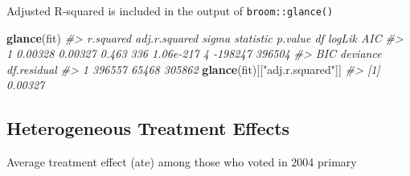 \documentclass[]{book}
\newenvironment{Shaded}{\begin{snugshade}}{\end{snugshade}}
\newcommand{\KeywordTok}[1]{\textcolor[rgb]{0.13,0.29,0.53}{\textbf{#1}}}
\newcommand{\DataTypeTok}[1]{\textcolor[rgb]{0.13,0.29,0.53}{#1}}
\newcommand{\StringTok}[1]{\textcolor[rgb]{0.31,0.60,0.02}{#1}}
\newcommand{\CommentTok}[1]{\textcolor[rgb]{0.56,0.35,0.01}{\textit{#1}}}
\newcommand{\OperatorTok}[1]{\textcolor[rgb]{0.81,0.36,0.00}{\textbf{#1}}}
\newcommand{\NormalTok}[1]{#1}
\theoremstyle{definition}
\theoremstyle{definition}
\theoremstyle{definition}
\theoremstyle{remark}
\begin{document}
\begin{Shaded}
\end{Shaded}

Adjusted R-squared is included in the output of \texttt{broom::glance()}

\begin{Shaded}
\begin{Highlighting}[]
\KeywordTok{glance}\NormalTok{(fit)}
\CommentTok{#>   r.squared adj.r.squared sigma statistic   p.value df  logLik    AIC}
\CommentTok{#> 1   0.00328       0.00327 0.463       336 1.06e-217  4 -198247 396504}
\CommentTok{#>      BIC deviance df.residual}
\CommentTok{#> 1 396557    65468      305862}
\KeywordTok{glance}\NormalTok{(fit)[[}\StringTok{"adj.r.squared"}\NormalTok{]]}
\CommentTok{#> [1] 0.00327}
\end{Highlighting}
\end{Shaded}

\subsection{Heterogeneous Treatment
Effects}\label{heterogeneous-treatment-effects}

Average treatment effect (ate) among those who voted in 2004 primary
\end{document}
